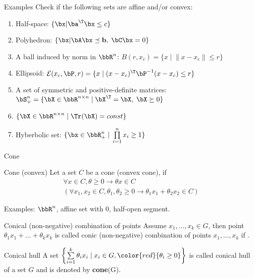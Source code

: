 \documentclass[12pt,russian]{beamer}
\begin{document}
\begin{frame}{Examples}
Check if the following sets are affine and/or convex:
\begin{enumerate}
\item Half-space: $\{ \bx | \ba^{\T} \bx \leq c \}$
\item Polyhedron: $\{ \bx | \bA\bx \preceq \mathbf{b}, \; \bC\bx = 0 \}$
\item A ball induced by norm in $\bbR^n$: $B(r, x_c) = \{ x \; | \; \| x - x_c \| \leq r \}$
\item Ellipsoid: $\mathcal{E}(x_c, \bP, r) = \{ x \; | \; (x - x_c)^{\T}\bP^{-1} (x - x_c) \leq r \}$
\item A set of symmetric and positive-definite matrices: $\bS^n_+ = \{ \bX \in \bbR^{n \times n} \; | \; \bX^{\T} = \bX, \; \bX \succeq 0 \}$
\item $\{ \bX \in \bbR^{n \times n} \; | \; \Tr(\bX) = const \}$
\item Hyberbolic set: $\{ \bx \in \bbR^n_+ \; | \; \prod\limits_{i=1}^n x_i \geq 1 \}$
\end{enumerate}
\end{frame}

\begin{frame}{Cone}
\small
\begin{block}{Cone (convex)}
Let a set $C$ be a cone (convex cone), if 
\vspace{-4mm}
\begin{equation*}
\begin{split}
& \forall x \in C, \theta \geq 0 \rightarrow \theta x \in C \\
& (\forall x_1, x_2 \in C, \theta_1, \theta_2 \geq 0 \rightarrow \theta_1 x_1 + \theta_2 x_2 \in C)
\end{split}
\end{equation*}
\vspace{-4mm}
\end{block}
Examples: $\bbR^n$, affine set with 0, half-open segment.
\begin{block}{Conical (non-negative) combination of points}
Assume $x_1, \ldots, x_k \in G$, then point $\theta_1 x_1 + \ldots + \theta_k x_k$ is called conic (non-negative) combination of points $x_1,\ldots,x_k$ if {\color{red}{$\theta_i \geq 0$}}.
\end{block}

\begin{block}{Conical hull}
A set $\left\{ \sum\limits_{i=1}^k \theta_i x_i \; | \; x_i \in G, {\color{red}{\theta_i \geq 0}} \right\}$ is called conical hull of a set $G$ and is denoted by \textbf{cone}(G).
\end{block}
\end{frame}
\end{document}
